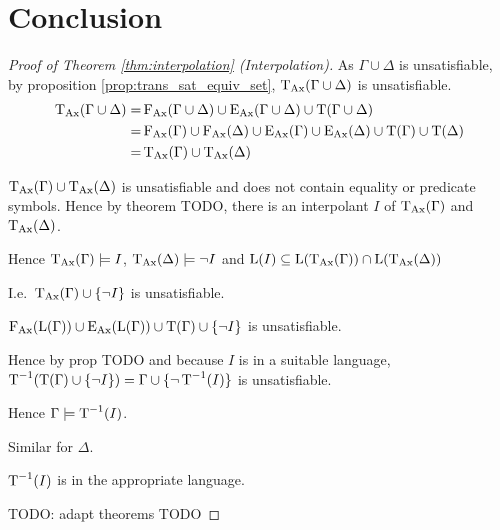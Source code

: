 \section{Conclusion}

\begin{proof}[Proof of Theorem \ref{thm:interpolation} (Interpolation)]
	As $\Gamma \cup \Delta$ is unsatisfiable,
	by proposition \ref{prop:trans_sat_equiv_set}, $\operatorname{\operatorname{T}_{Ax}}(\Gamma \cup \Delta)$ is unsatisfiable.
	\begin{align*}
		\operatorname{\operatorname{T}_{Ax}}(\Gamma \cup \Delta) = &\operatorname{F_{Ax}}(\Gamma\cup\Delta) \cup \operatorname{E_{Ax}}(\Gamma \cup\Delta) \cup \operatorname{T}(\Gamma \cup \Delta) \\
		= &\operatorname{F_{Ax}}(\Gamma)\cup\operatorname{F_{Ax}}(\Delta) \cup \operatorname{E_{Ax}}(\Gamma)\cup \operatorname{E_{Ax}}(\Delta) \cup \operatorname{T}(\Gamma ) \cup \operatorname{T}(\Delta) \\
		= &\operatorname{\operatorname{T}_{Ax}}(\Gamma) \cup \operatorname{\operatorname{T}_{Ax}}(\Delta)
	\end{align*}


	$\operatorname{\operatorname{T}_{Ax}}(\Gamma) \cup \operatorname{\operatorname{T}_{Ax}}(\Delta)$ is unsatisfiable and does not contain equality or predicate symbols. Hence by theorem TODO, there is an interpolant $I$ of $\operatorname{\operatorname{T}_{Ax}}(\Gamma)$ and $\operatorname{\operatorname{T}_{Ax}}(\Delta)$.

	Hence
	$\operatorname{\operatorname{T}_{Ax}}(\Gamma) \models I$,
	$\operatorname{\operatorname{T}_{Ax}}(\Delta) \models \lnot I$ and
	$\operatorname{L}(I) \subseteq \operatorname{L}(\operatorname{\operatorname{T}_{Ax}}(\Gamma)) \cap \operatorname{L}(\operatorname{\operatorname{T}_{Ax}}(\Delta))$

	I.e.\ $\operatorname{\operatorname{T}_{Ax}}(\Gamma) \cup \{\lnot I\}$ is unsatisfiable.

	$\operatorname{F_{Ax}}(\operatorname{L}(\Gamma)) \cup \operatorname{E_{Ax}}(\operatorname{L}(\Gamma)) \cup \operatorname{T}(\Gamma) \cup \{\lnot I\}$ is unsatisfiable.

	Hence by prop TODO and because $I$ is in a suitable language, 
	$\operatorname{T}^{-1} ( \operatorname{T}(\Gamma) \cup \{\lnot I\})  = \Gamma \cup \{ \lnot \operatorname{T}^{-1}(I)\}$ is unsatisfiable.

	Hence $\Gamma \models \operatorname{T}^{-1}(I)$.

	Similar for $\Delta$.

	$\operatorname{T}^{-1}(I)$ is in the appropriate language.

	TODO: adapt theorems TODO
\end{proof}


